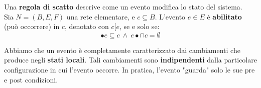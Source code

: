 \begin{center}
\end{center}

\noindent
Una \textbf{regola di scatto} descrive come un evento modifica lo stato del sistema.\\
Sia $N = (B, E, F)$ una rete elementare, e $c \subseteq B$. L'evento $e \in E$ è \textbf{abilitato} (può occorrere) in  $c$, denotato con $c[e$, se e solo se:
\[
	\bullet e \subseteq c \ \wedge \ e \bullet \cap c = \emptyset
\]

\noindent
Abbiamo che un evento è completamente caratterizzato dai cambiamenti che produce negli \textbf{stati locali}. Tali cambiamenti sono \textbf{indipendenti} dalla particolare configurazione in cui l'evento occorre. In pratica, l'evento "guarda" solo le sue pre e post condizioni.

